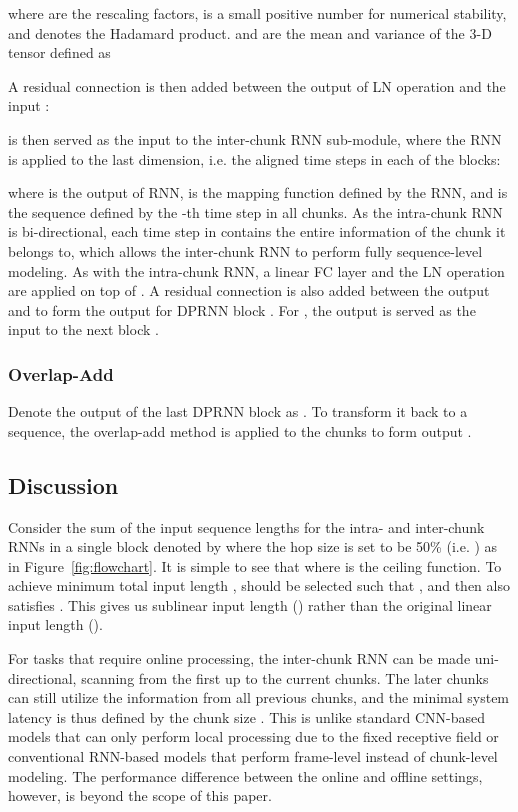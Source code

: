 \documentclass{article}
\begin{document}
where  are the rescaling factors,  is a small positive number for numerical stability, and  denotes the Hadamard product.  and  are the mean and variance of the 3-D tensor defined as


A residual connection is then added between the output of LN operation and the input :

 is then served as the input to the inter-chunk RNN sub-module, where the RNN is applied to the last dimension, i.e. the aligned  time steps in each of the  blocks:

where  is the output of RNN,  is the mapping function defined by the RNN, and  is the sequence defined by the -th time step in all  chunks. As the intra-chunk RNN is bi-directional, each time step in  contains the entire information of the chunk it belongs to, which allows the inter-chunk RNN to perform fully sequence-level modeling. As with the intra-chunk RNN, a linear FC layer and the LN operation are applied on top of . A residual connection is also added between the output and  to form the output for DPRNN block . For , the output is served as the input to the next block .

\subsubsection{Overlap-Add}

Denote the output of the last DPRNN block as . To transform it back to a sequence, the overlap-add method is applied to the  chunks to form output .

\subsection{Discussion}
\label{sec:dprnn_dis}

Consider the sum of the input sequence lengths for the intra- and inter-chunk RNNs in a single block denoted by  where the hop size is set to be 50\% (i.e. ) as in Figure~\ref{fig:flowchart}. It is simple to see that  where  is the ceiling function. To achieve minimum total input length ,  should be selected such that , and then  also satisfies . This gives us sublinear input length () rather than the original linear input length ().

For tasks that require online processing, the inter-chunk RNN can be made uni-directional, scanning from the first up to the current chunks. The later chunks can still utilize the information from all previous chunks, and the minimal system latency is thus defined by the chunk size . This is unlike standard CNN-based models that can only perform local processing due to the fixed receptive field or conventional RNN-based models that perform frame-level instead of chunk-level modeling. The performance difference between the online and offline settings, however, is beyond the scope of this paper.
\end{document}
